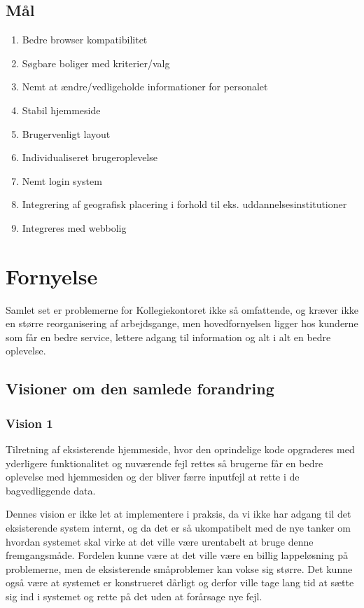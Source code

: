 \documentclass[12pt, a4paper]{report}
\begin{document}
\subsection{Mål}
\begin{enumerate}
\item Bedre browser kompatibilitet
\item Søgbare boliger med kriterier/valg
\item Nemt at ændre/vedligeholde informationer for personalet
\item Stabil hjemmeside
\item Brugervenligt layout
\item Individualiseret brugeroplevelse
\item Nemt login system
\item Integrering af geografisk placering i forhold til eks. uddannelsesinstitutioner
\item Integreres med webbolig
\end{enumerate}


\section{Fornyelse}
Samlet set er problemerne for Kollegiekontoret ikke så omfattende, og kræver ikke en større reorganisering af arbejdsgange, men hovedfornyelsen ligger hos kunderne som får en bedre service, lettere adgang til information og alt i alt en bedre oplevelse.

\subsection{Visioner om den samlede forandring}
\subsubsection{Vision 1}
Tilretning af eksisterende hjemmeside, hvor den oprindelige kode opgraderes med yderligere funktionalitet og nuværende fejl rettes så brugerne får en bedre oplevelse med hjemmesiden og der bliver færre inputfejl at rette i de bagvedliggende data.

Dennes vision er ikke let at implementere i praksis, da vi ikke har adgang til det eksisterende system internt, og da det er så ukompatibelt med de nye tanker om hvordan systemet skal virke at det ville være urentabelt at bruge denne fremgangsmåde. Fordelen kunne være at det ville være en billig lappeløsning på problemerne, men de eksisterende småproblemer kan vokse sig større. Det kunne også være at systemet er konstrueret dårligt og derfor ville tage lang tid at sætte sig ind i systemet og rette på det uden at forårsage nye fejl.
\end{document}
